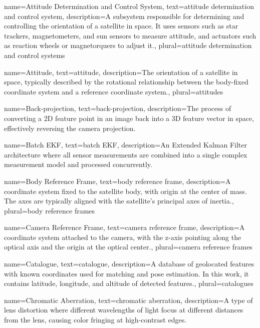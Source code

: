 {
	name=Attitude Determination and Control System,
	text=attitude determination and control system,
	description={A subsystem responsible for determining and controlling the orientation of a satellite in space. It uses sensors such as star trackers, magnetometers, and sun sensors to measure attitude, and actuators such as reaction wheels or magnetorquers to adjust it.},
	plural=attitude determination and control systems
}

{ 
	name=Attitude,
	text=attitude,
	description={The orientation of a satellite in space, typically described by the rotational relationship between the body-fixed coordinate system and a reference coordinate system.},
	plural=attitudes
}

{
	name=Back-projection,
	text=back-projection,
	description={The process of converting a 2D feature point in an image back into a 3D feature vector in space, effectively reversing the camera projection.}
}

{
	name=Batch EKF,
	text=batch EKF,
	description={An Extended Kalman Filter architecture where all sensor measurements are combined into a single complex measurement model and processed concurrently.}
}

{
	name=Body Reference Frame,
	text=body reference frame,
	description={A coordinate system fixed to the satellite body, with origin at the center of mass. The axes are typically aligned with the satellite's principal axes of inertia.},
	plural=body reference frames
}

{
	name=Camera Reference Frame,
	text=camera reference frame,
	description={A coordinate system attached to the camera, with the z-axis pointing along the optical axis and the origin at the optical center.},
	plural=camera reference frames
}

{
	name=Catalogue,
	text=catalogue,
	description={A database of geolocated features with known coordinates used for matching and pose estimation. In this work, it contains latitude, longitude, and altitude of detected features.},
	plural=catalogues
}

{
	name=Chromatic Aberration,
	text=chromatic aberration,
	description={A type of lens distortion where different wavelengths of light focus at different distances from the lens, causing color fringing at high-contrast edges.}
}

